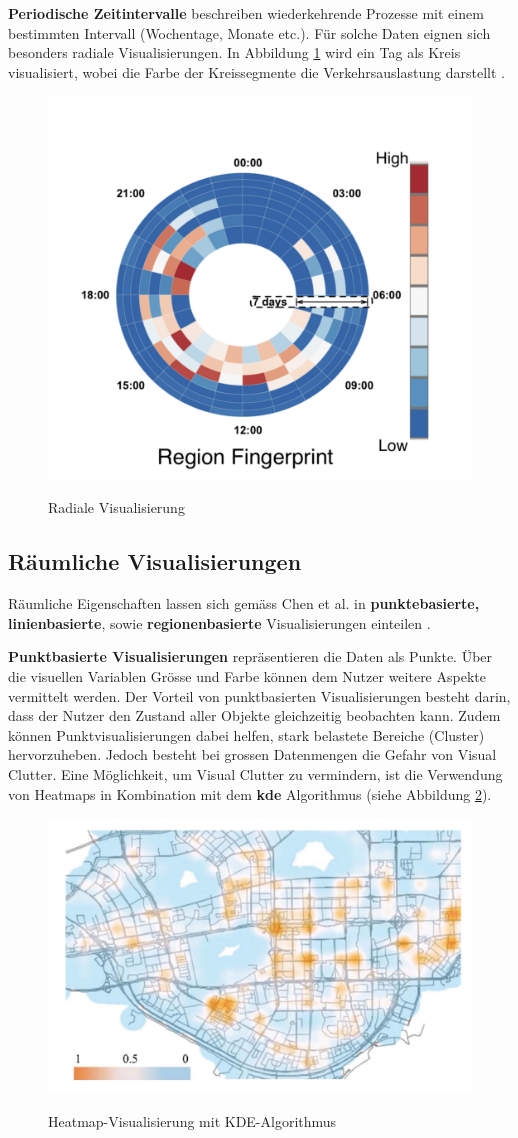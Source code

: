 \textbf{Periodische Zeitintervalle} beschreiben wiederkehrende Prozesse mit einem bestimmten Intervall (Wochentage, Monate etc.). Für solche Daten eignen sich besonders radiale Visualisierungen. In Abbildung \ref{fig_radial_layout} wird ein Tag als Kreis visualisiert, wobei die Farbe der Kreissegmente die Verkehrsauslastung darstellt \parencite[S. 2973 - 2974]{survey_traffic_data_visualization_2015}.

\begin{figure}[H]
    \caption{Radiale Visualisierung \parencite[S. 5]{radial_layout_t_watcher}}
    \includegraphics[width=.5\linewidth]{content/00_assets/radial_layout.png}
    \label{fig_radial_layout}
\end{figure}

\subsection{Räumliche Visualisierungen}
Räumliche Eigenschaften lassen sich gemäss Chen et al. in \textbf{punktebasierte, linienbasierte}, sowie \textbf{regionenbasierte} Visualisierungen einteilen \parencite[S. 2974 - 2975]{survey_traffic_data_visualization_2015}.

\textbf{Punktbasierte Visualisierungen} repräsentieren die Daten als Punkte. Über die visuellen Variablen Grösse und Farbe können dem Nutzer weitere Aspekte vermittelt werden. Der Vorteil von punktbasierten Visualisierungen besteht darin, dass der Nutzer den Zustand aller Objekte gleichzeitig beobachten kann. Zudem können Punktvisualisierungen dabei helfen, stark belastete Bereiche (Cluster) hervorzuheben. Jedoch besteht bei grossen Datenmengen die Gefahr von Visual Clutter. Eine Möglichkeit, um Visual Clutter zu vermindern, ist die Verwendung von Heatmaps in Kombination mit dem \textbf{\acrfull{kde}} Algorithmus (siehe Abbildung \ref{fig_heatmap_kde}).

\begin{figure}[H]
    \caption{Heatmap-Visualisierung mit KDE-Algorithmus \parencite{vait_system}}
    \includegraphics[width=.5\linewidth]{content/00_assets/heatmap_kde.png}
    \label{fig_heatmap_kde}
\end{figure}

